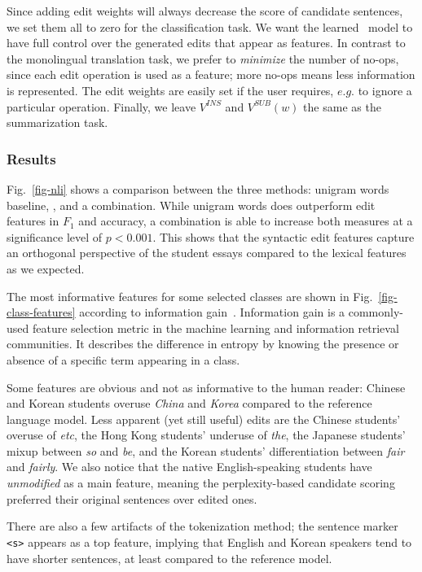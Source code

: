 Since adding edit weights will always decrease the score of candidate sentences,
we set them all to zero for the classification task. We want the learned
\sd~model to have full control over the generated edits that appear as features.
In contrast to the monolingual translation task, we prefer to \emph{minimize}
the number of no-ops, since each edit operation is used as a feature; more
no-ops means less information is represented. The edit weights are easily set if
the user requires, $e.g.$ to ignore a particular operation. Finally, we leave
$V^{INS}$ and $V^{SUB}(w)$ the same as the summarization task.



\subsubsection{Results}

Fig.~\ref{fig-nli} shows a comparison between the three methods: unigram words
baseline, \sd, and a combination. While unigram words does outperform edit
features in $F_1$ and accuracy, a combination is able to increase both measures
at a significance level of $p < 0.001$. This shows that the syntactic edit
features capture an orthogonal perspective of the student essays compared to
the lexical features as we expected.


The most informative features for some selected classes are shown in
Fig.~\ref{fig-class-features} according to information
gain~\cite{feature-selection}. Information gain is a commonly-used feature
selection metric in the machine learning and information retrieval communities.
It describes the difference in entropy by knowing the presence or absence of a
specific term appearing in a class.

Some features are obvious and not as informative to the human reader: Chinese
and Korean students overuse \emph{China} and \emph{Korea} compared to the
reference language model. Less apparent (yet still useful) edits are the
Chinese students' overuse of \emph{etc}, the Hong Kong students' underuse of
\emph{the}, the Japanese students' mixup between \emph{so} and \emph{be}, and
the Korean students' differentiation between \emph{fair} and \emph{fairly}. We
also notice that the native English-speaking students have \emph{unmodified} as
a main feature, meaning the perplexity-based candidate scoring preferred their
original sentences over edited ones.

There are also a few artifacts of the tokenization method; the sentence marker
\texttt{<s>} appears as a top feature, implying that English and Korean speakers
tend to have shorter sentences, at least compared to the reference model.


